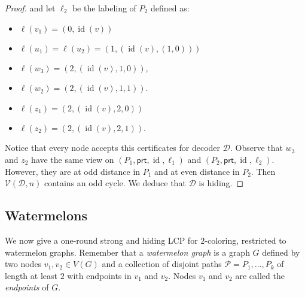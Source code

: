 \documentclass[11pt]{article}
\DeclareMathOperator{\id}{id}
\newcommand*{\alvgd}{\mathcal{V}(\mathcal{D},n)}
\newcommand*{\ports}{\mathsf{prt}}
\begin{document}
\begin{proof}
and let $\ell_2$ be the labeling of $P_2$  defined as:
\begin{multicols}{2}
\begin{itemize}
    \item $\ell(v_1) = (0,\id(v))$
    \item $\ell(u_1) = \ell(u_2) = (1, (\id(v), (1,0)))$
    \item $\ell(w_3) = (2, (\id(v), 1, 0))$,
    \item $\ell(w_2) = (2, (\id(v), 1, 1))$.
    \item $\ell(z_1) = (2, (\id(v), 2, 0))$
    \item $\ell(z_2) = (2, (\id(v), 2, 1))$. 
\end{itemize}
\end{multicols}
Notice that every node accepts this certificates for decoder $\mathcal{D}$. Observe that $w_3$ and $z_2$ have the same view on $(P_1, \ports, \id, \ell_1)$ and $(P_2, \ports, \id, \ell_2)$. However, they are at odd distance in $P_1$ and at even distance in $P_2$. Then $\alvgd$ contains an odd cycle. We deduce that $\mathcal{D}$ is hiding. 
\end{proof}


\subsection{Watermelons}

We now give a one-round strong and hiding LCP for $2$-coloring, restricted to watermelon graphs. Remember that a \emph{watermelon graph} is a graph $G$ defined by two nodes $v_1,v_2\in V(G)$ and a collection of disjoint paths $\mathcal{P} = P_1, \dots, P_k$ of length at least $2$ with endpoints in $v_1$ and $v_2$. Nodes $v_1$ and $v_2$ are called the \emph{endpoints} of $G$.
\restateThmWatermelons*




\end{document}
